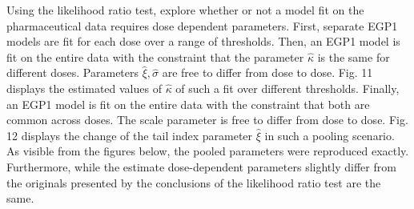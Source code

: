 \documentclass[12pt]{article}
\theoremstyle{definition}
\theoremstyle{definition}
\begin{document}
Using the likelihood ratio test, \cite{papatawn} explore whether or not a model fit on the pharmaceutical data requires dose dependent parameters. First, separate EGP1 models are fit for each dose over a range of thresholds. Then, an EGP1 model is fit on the entire data with the constraint that the parameter $\hat\kappa$ is the same for different doses. Parameters $\hat \xi, \hat\sigma$ are free to differ from dose to dose.  Fig. 11 displays the estimated values of $\hat\kappa$ of such a fit over different thresholds. Finally, an EGP1 model is fit on the entire data with the constraint that both  are common across doses. The scale parameter is free to differ from dose to dose. Fig. 12 displays the change of the tail index parameter $\hat \xi$ in such a pooling scenario. As visible from the figures below, the pooled parameters were reproduced exactly. Furthermore, while the estimate dose-dependent parameters slightly differ from the originals presented by \cite{papatawn} the conclusions of the likelihood ratio test are the same.
\end{document}
